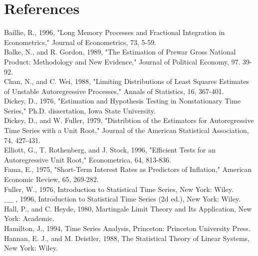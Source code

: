 \documentclass[10pt]{article}
\begin{document}
\section*{References}
Baillie, R., 1996, "Long Memory Processes and Fractional Integration in Econometrics," Journal of Econometrics, 73, 5-59.\\
Balke, N., and R. Gordon, 1989, "The Estimation of Prewar Gross National Product: Methodology and New Evidence," Journal of Political Economy, 97. 39-92.\\
Chan, N., and C. Wei, 1988, "Limiting Distributions of Least Squares Estimates of Unstable Autoregressive Processes," Annals of Statistics, 16, 367-401.\\
Dickey, D., 1976, "Estimation and Hypothesis Testing in Nonstationary Time Series," Ph.D. dissertation, Iowa State University.\\
Dickey, D., and W. Fuller, 1979, "Distribtion of the Estimators for Autoregressive Time Series with a Unit Root," Journal of the American Statistical Association, 74, 427-431.\\
Elliott, G., T. Rothenberg, and J. Stock, 1996, "Efficient Tests for an Autoregressive Unit Root," Econometrica, 64, 813-836.\\
Fama, E., 1975, "Short-Term Interest Rates as Predictors of Inflation," American Economic Review, 65, 269-282.\\
Fuller, W., 1976, Introduction to Statistical Time Series, New York: Wiley.\\
$\_\_\_\_$ , 1996, Introduction to Statistical Time Series (2d ed.), New York: Wiley.\\
Hall, P., and C. Heyde, 1980, Martingale Limit Theory and Its Application, New York: Academic.\\
Hamilton, J., 1994, Time Series Analysis, Princeton: Princeton University Press.\\
Hannan, E. J., and M. Deistler, 1988, The Statistical Theory of Linear Systems, New York: Wiley.
\end{document}

